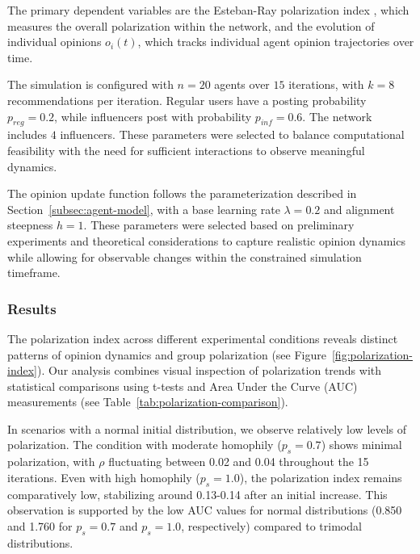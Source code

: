 The primary dependent variables are the Esteban-Ray polarization index \citep{esteban_on_1994}, which measures the overall polarization within the network, and the evolution of individual opinions $o_i(t)$, which tracks individual agent opinion trajectories over time.

The simulation is configured with $n = 20$ agents over $15$ iterations, with $k = 8$ recommendations per iteration. Regular users have a posting probability $p_{reg} = 0.2$, while influencers post with probability $p_{inf} = 0.6$. The network includes $4$ influencers. These parameters were selected to balance computational feasibility with the need for sufficient interactions to observe meaningful dynamics.

The opinion update function follows the parameterization described in Section~\ref{subsec:agent-model}, with a base learning rate $\lambda = 0.2$ and alignment steepness $h = 1$. These parameters were selected based on preliminary experiments and theoretical considerations to capture realistic opinion dynamics while allowing for observable changes within the constrained simulation timeframe.




\subsubsection{Results}

The polarization index across different experimental conditions reveals distinct patterns of opinion dynamics and group polarization (see Figure~\ref{fig:polarization-index}). Our analysis combines visual inspection of polarization trends with statistical comparisons using t-tests and Area Under the Curve (AUC) measurements (see Table~\ref{tab:polarization-comparison}).

In scenarios with a normal initial distribution, we observe relatively low levels of polarization. The condition with moderate homophily ($p_s = 0.7$) shows minimal polarization, with $\rho$ fluctuating between 0.02 and 0.04 throughout the 15 iterations. Even with high homophily ($p_s = 1.0$), the polarization index remains comparatively low, stabilizing around 0.13-0.14 after an initial increase. This observation is supported by the low AUC values for normal distributions (0.850 and 1.760 for $p_s = 0.7$ and $p_s = 1.0$, respectively) compared to trimodal distributions.

